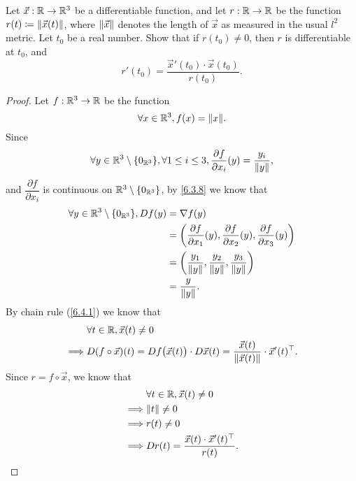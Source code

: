 \begin{ex}\label{ex:6.4.5}
  Let \(\vec{x} : \R \to \R^3\) be a differentiable function, and let \(r : \R \to \R\) be the function \(r(t) \coloneqq \norm*{\vec{x}(t)}\), where \(\norm*{\vec{x}}\) denotes the length of \(\vec{x}\) as measured in the usual \(l^2\) metric.
  Let \(t_0\) be a real number.
  Show that if \(r(t_0) \neq 0\), then \(r\) is differentiable at \(t_0\), and
  \[
    r'(t_0) = \dfrac{\vec{x}'(t_0) \cdot \vec{x}(t_0)}{r(t_0)}.
  \]
\end{ex}

\begin{proof}
  Let \(f : \R^3 \to \R\) be the function
  \[
    \forall x \in \R^3, f(x) = \norm*{x}.
  \]
  Since
  \[
    \forall y \in \R^3 \setminus \set{0_{\R^3}}, \forall 1 \leq i \leq 3, \dfrac{\partial f}{\partial x_i}(y) = \dfrac{y_i}{\norm*{y}},
  \]
  and \(\dfrac{\partial f}{\partial x_i}\) is continuous on \(\R^3 \setminus \set{0_{\R^3}}\), by \cref{6.3.8} we know that
  \begin{align*}
    \forall y \in \R^3 \setminus \set{0_{\R^3}}, D f(y) & = \nabla f(y)                                                                                                               \\
                                                        & = \bigg(\dfrac{\partial f}{\partial x_1}(y), \dfrac{\partial f}{\partial x_2}(y), \dfrac{\partial f}{\partial x_3}(y)\bigg) \\
                                                        & = \bigg(\dfrac{y_1}{\norm*{y}}, \dfrac{y_2}{\norm*{y}}, \dfrac{y_3}{\norm*{y}}\bigg)                                        \\
                                                        & = \dfrac{y}{\norm*{y}}.
  \end{align*}
  By chain rule (\cref{6.4.1}) we know that
  \begin{align*}
             & \forall t \in \R, \vec{x}(t) \neq 0                                                                                                  \\
    \implies & D (f \circ \vec{x})(t) = D f\big(\vec{x}(t)\big) \cdot D \vec{x}(t) = \dfrac{\vec{x}(t)}{\norm*{\vec{x}(t)}} \cdot \vec{x}'(t)^\top.
  \end{align*}
  Since \(r = f \circ \vec{x}\), we know that
  \begin{align*}
             & \forall t \in \R, \vec{x}(t) \neq 0                       \\
    \implies & \norm*{t} \neq 0                                          \\
    \implies & r(t) \neq 0                                               \\
    \implies & D r(t) = \dfrac{\vec{x}(t) \cdot \vec{x}'(t)^\top}{r(t)}.
  \end{align*}
\end{proof}
